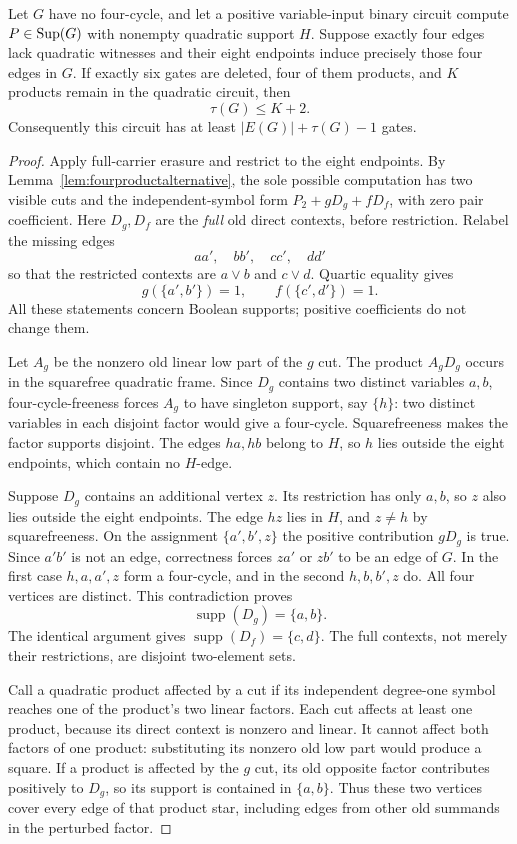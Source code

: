 \begin{proposition}\label{prop:sixmatchingcover}
Let $G$ have no four-cycle, and let a positive variable-input binary circuit compute $P\in\operatorname{Sup}(G)$ with nonempty quadratic support $H$. Suppose exactly four edges lack quadratic witnesses and their eight endpoints induce precisely those four edges in $G$. If exactly six gates are deleted, four of them products, and $K$ products remain in the quadratic circuit, then
\[
 \tau(G)\le K+2.
\]
Consequently this circuit has at least $|E(G)|+\tau(G)-1$ gates.
\end{proposition}
\begin{proof}
Apply full-carrier erasure and restrict to the eight endpoints. By Lemma~\ref{lem:fourproductalternative}, the sole possible computation has two visible cuts and the independent-symbol form $P_2+gD_g+fD_f$, with zero pair coefficient. Here $D_g,D_f$ are the \emph{full} old direct contexts, before restriction. Relabel the missing edges
\[
 aa',\quad bb',\quad cc',\quad dd'
\]
so that the restricted contexts are $a\vee b$ and $c\vee d$. Quartic equality gives
\[
 g(\{a',b'\})=1,\qquad f(\{c',d'\})=1.
\]
All these statements concern Boolean supports; positive coefficients do not change them.

Let $A_g$ be the nonzero old linear low part of the $g$ cut. The product $A_gD_g$ occurs in the squarefree quadratic frame. Since $D_g$ contains two distinct variables $a,b$, four-cycle-freeness forces $A_g$ to have singleton support, say $\{h\}$: two distinct variables in each disjoint factor would give a four-cycle. Squarefreeness makes the factor supports disjoint. The edges $ha,hb$ belong to $H$, so $h$ lies outside the eight endpoints, which contain no $H$-edge.

Suppose $D_g$ contains an additional vertex $z$. Its restriction has only $a,b$, so $z$ also lies outside the eight endpoints. The edge $hz$ lies in $H$, and $z\ne h$ by squarefreeness. On the assignment $\{a',b',z\}$ the positive contribution $gD_g$ is true. Since $a'b'$ is not an edge, correctness forces $za'$ or $zb'$ to be an edge of $G$. In the first case $h,a,a',z$ form a four-cycle, and in the second $h,b,b',z$ do. All four vertices are distinct. This contradiction proves
\[
 \operatorname{supp}(D_g)=\{a,b\}.
\]
The identical argument gives $\operatorname{supp}(D_f)=\{c,d\}$. The full contexts, not merely their restrictions, are disjoint two-element sets.

Call a quadratic product affected by a cut if its independent degree-one symbol reaches one of the product's two linear factors. Each cut affects at least one product, because its direct context is nonzero and linear. It cannot affect both factors of one product: substituting its nonzero old low part would produce a square. If a product is affected by the $g$ cut, its old opposite factor contributes positively to $D_g$, so its support is contained in $\{a,b\}$. Thus these two vertices cover every edge of that product star, including edges from other old summands in the perturbed factor.


\end{proof}
